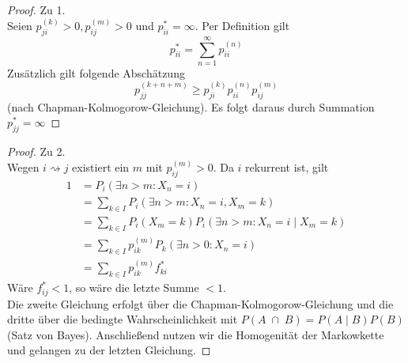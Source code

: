 \documentclass[a4paper]{article}
\begin{document}
\begin{proof}
	Zu 1.
	\\

	Seien $p_{ji} ^{(k)} > 0, p_{ij} ^{(m)} > 0$ und 
	$p_{ii} ^{*} = \infty$. Per Definition gilt
	\[
	p_{ii} ^{*} = \sum_{n=1}^{\infty} p_{ii} ^{(n)}
	\] 
	Zusätzlich gilt folgende Abschätzung 
	\[
	p_{jj} ^{(k+n+m)} \geq p_{ji} ^{(k)}
	p_{ii} ^{(n)} p_{ij} ^{(m)}
	\] 
	(nach Chapman-Kolmogorow-Gleichung).
	Es folgt daraus durch Summation $p_{jj} ^{*} = \infty$
\end{proof}

\begin{proof}
	Zu 2.
	\\
	
	Wegen $i \rightsquigarrow j$ existiert ein $m$ mit $p_{ij} ^{(m)} > 0$.
	Da $i$ rekurrent ist, gilt
	\begin{align*}
		1 &= P_i \left(
			\exists n > m : X_n = i
		\right) \\
		  &= \sum_{k \in I} P_i \left(
		  	\exists n > m: X_n = i, X_m = k
		  \right) \\
		  &= \sum_{k \in I}
		  P_i (X_m = k)
		  P_i \left(
		  	\exists n > m: X_n = i \; \vert \; X_m = k
		  \right) \\
		  &= \sum_{k \in I}
		  p_{ik} ^{(m)}
		  P_k \left(
		  	\exists n > 0: X_n = i
		  \right) \\
		  &= \sum_{k \in I}
		  p_{ik} ^{(m)}
		  f_{ki} ^{*}
	\end{align*}
	Wäre $f_{ij} ^{*} < 1$, so wäre die letzte Summe $<1$.
	\\

	Die zweite Gleichung erfolgt über die Chapman-Kolmogorow-Gleichung und die dritte über die
	bedingte Wahrscheinlichkeit mit $P(A \; \cap \; B) = P(A \; \vert \; B) P(B)$
	(Satz von Bayes). Anschließend nutzen wir die
	Homogenität der Markowkette und gelangen zu der letzten Gleichung.
\end{proof}
\end{document}
